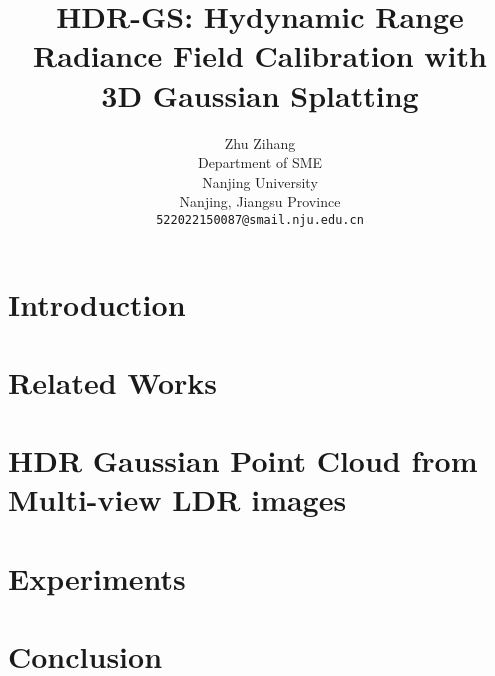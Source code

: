 \documentclass{arxiv_art/arxiv_art}
\title{HDR-GS: Hydynamic Range Radiance Field Calibration with 3D Gaussian Splatting}
\author{
    \hspace{1mm}Zhu Zihang \\
    Department of SME \\
    Nanjing University\\
    Nanjing, Jiangsu Province \\
    \texttt{522022150087@smail.nju.edu.cn}
}
\begin{document}
\maketitle 

\begin{abstract}
    
\end{abstract}

\section{Introduction}
\label{sec:intro}


\section{Related Works}
\label{sec:related}


\section{HDR Gaussian Point Cloud from Multi-view LDR images}
\label{sec:method}


\section{Experiments}
\label{sec:experiments}


\section{Conclusion}
\label{sec:conclusion}



%
%


\end{document}
